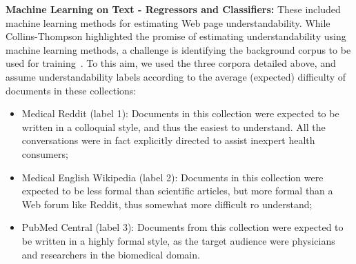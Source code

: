


\textbf{Machine Learning on Text - Regressors and Classifiers:} These included machine learning methods for estimating Web page understandability. While Collins-Thompson highlighted the promise of estimating understandability using machine learning methods, a challenge is identifying the background corpus to be used for training~\cite{collins2014computational}. To this aim, we used the three corpora detailed above, and assume understandability labels according to the average (expected) difficulty of documents in these collections:





\begin{itemize}
    \item Medical Reddit (label 1): Documents in this collection were expected to be written in a colloquial style, and thus the easiest to understand. All the conversations were in fact explicitly directed to assist inexpert health consumers;
    \item Medical English Wikipedia (label 2): Documents in this collection were expected to be less formal than scientific articles, but more formal than a Web forum like Reddit, thus somewhat more difficult ro understand;
    \item PubMed Central (label 3): Documents from this collection were expected to be written in a highly formal style, as the target audience were physicians and researchers in the biomedical domain.
\end{itemize}

